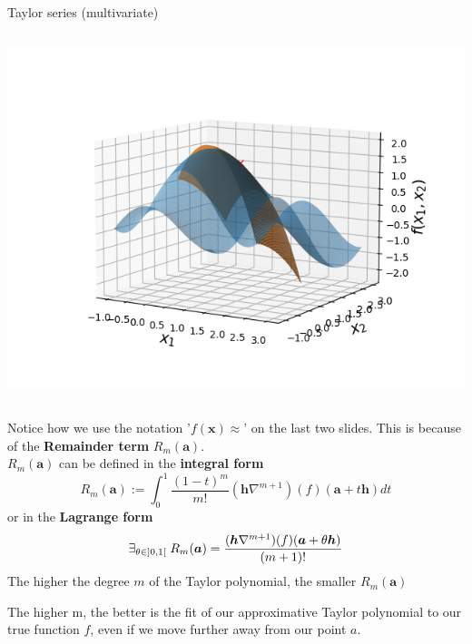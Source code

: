 \begin{vbframe}{Taylor series (multivariate)}
\begin{columns}
\begin{column}{0.48\textwidth}
      \includegraphics[width = \textwidth]{figure_man/Taylor2D/Taylor2D_2nd-301.png}
    \end{column}
  \end{columns}  

  \framebreak

  Notice how we use the notation '$f(\bm{x}) \approx$' on the last two slides. This is because of the \textbf{Remainder term} $R_{m}(\bm{a})$.\\
  $R_{m}(\bm{a})$ can be defined in the \textbf{integral form}
  $$R_{m}(\bm{a}) := \int_{0}^{1}\frac{(1-t)^{m}}{m!}(\bm{h}\nabla^{m+1})(f)(\bm{a}+t\bm{h}) dt$$
  or in the \textbf{Lagrange form}
  $$\exists_{\theta \in ]0,1[} \hspace{0.1cm} R_{m}(\bm{a}) = \frac{(\bm{h}\nabla^{m+1})(f)(\bm{a}+\theta\bm{h})}{(m+1)!}$$
  The higher the degree $m$ of the Taylor polynomial, the smaller $R_{m}(\bm{a})$

   \framebreak
   The higher m, the better is the fit of our approximative Taylor polynomial to our true function $f$, even if we move further away from our point $a$.


\end{vbframe}
